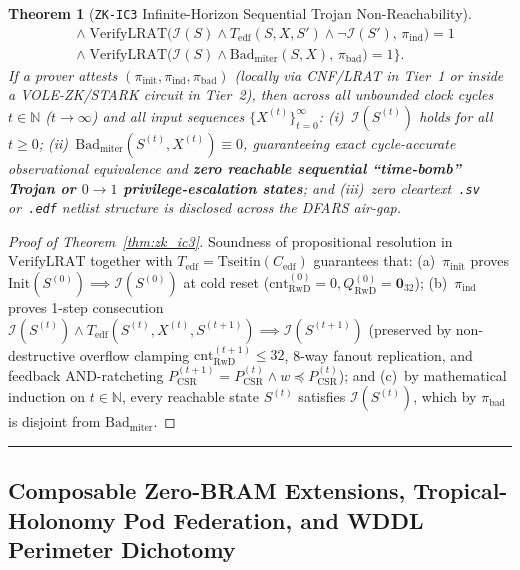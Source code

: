 \documentclass[10pt,twocolumn]{article}
\makeatletter
\newif\ifspecintwocol \specintwocolfalse
\newif\ifspecresume   \specresumefalse
\newcommand{\StartTwoCol}{%
  \if@twocolumn
    \let\spec@next\@empty
  \else
    \ifspecintwocol
      \let\spec@next\@empty
    \else
      \global\specintwocoltrue
      \def\spec@next{\begin{multicols}{2}}%
    \fi
  \fi
  \spec@next
}
\newcommand{\EndConnesPlate}{%
  \par\vspace{3pt}\noindent\textcolor{black!25}{\rule{\textwidth}{0.4pt}}\par\vspace{4pt}%
  \ifspecresume
    \global\specresumefalse
    \let\spec@platepost\StartTwoCol
  \else
    \let\spec@platepost\@empty
  \fi
  \spec@platepost
}
\theoremstyle{spectralthm}
\newtheorem{theorem}{Theorem}[section]
\makeatother
\begin{document}
\begin{theorem}[\texttt{ZK-IC3} Infinite-Horizon Sequential Trojan Non-Reachability]
\begin{equation}
\begin{aligned}
&\wedge\; \mathrm{VerifyLRAT}\bigl(\mathcal{I}(S) \wedge T_{\mathrm{edf}}(S,X,S') \wedge \neg\mathcal{I}(S'),\, \pi_{\mathrm{ind}}\bigr) = 1\\
&\wedge\; \mathrm{VerifyLRAT}\bigl(\mathcal{I}(S) \wedge \mathrm{Bad}_{\mathrm{miter}}(S,X),\, \pi_{\mathrm{bad}}\bigr) = 1\Bigr\}.
\end{aligned}
\end{equation}
If a prover attests $(\pi_{\mathrm{init}}, \pi_{\mathrm{ind}}, \pi_{\mathrm{bad}})$ (locally via CNF/LRAT in Tier~1 or inside a VOLE-ZK/STARK circuit in Tier~2), then across all unbounded clock cycles $t \in \mathbb{N}$ ($t \rightarrow \infty$) and all input sequences $\{X^{(t)}\}_{t=0}^{\infty}$: (i)~$\mathcal{I}(S^{(t)})$ holds for all $t \ge 0$; (ii)~$\mathrm{Bad}_{\mathrm{miter}}(S^{(t)}, X^{(t)}) \equiv 0$, guaranteeing exact cycle-accurate observational equivalence and \textbf{zero reachable sequential ``time-bomb'' Trojan or $0 \rightarrow 1$ privilege-escalation states}; and (iii)~zero cleartext~\texttt{.sv} or~\texttt{.edf} netlist structure is disclosed across the DFARS air-gap.
\end{theorem}
\begin{proof}[Proof of Theorem~\ref{thm:zk_ic3}]
Soundness of propositional resolution in $\mathrm{VerifyLRAT}$ together with $T_{\mathrm{edf}} = \mathrm{Tseitin}(C_{\mathrm{edf}})$ guarantees that: (a)~$\pi_{\mathrm{init}}$ proves $\mathrm{Init}(S^{(0)}) \implies \mathcal{I}(S^{(0)})$ at cold reset ($\mathrm{cnt}_{\mathrm{RwD}}^{(0)} = 0, Q_{\mathrm{RwD}}^{(0)} = \mathbf{0}_{32}$); (b)~$\pi_{\mathrm{ind}}$ proves 1-step consecution $\mathcal{I}(S^{(t)}) \wedge T_{\mathrm{edf}}(S^{(t)}, X^{(t)}, S^{(t+1)}) \implies \mathcal{I}(S^{(t+1)})$ (preserved by non-destructive overflow clamping $\mathrm{cnt}_{\mathrm{RwD}}^{(t+1)} \le 32$, 8-way fanout replication, and feedback AND-ratcheting $P_{\mathrm{CSR}}^{(t+1)} = P_{\mathrm{CSR}}^{(t)} \wedge w \preceq P_{\mathrm{CSR}}^{(t)}$); and (c)~by mathematical induction on $t \in \mathbb{N}$, every reachable state $S^{(t)}$ satisfies $\mathcal{I}(S^{(t)})$, which by $\pi_{\mathrm{bad}}$ is disjoint from $\mathrm{Bad}_{\mathrm{miter}}$.
\end{proof}
\global\specresumefalse\EndConnesPlate

\subsection{Composable Zero-BRAM Extensions, Tropical-Holonomy Pod Federation, and WDDL Perimeter Dichotomy}
\end{document}
